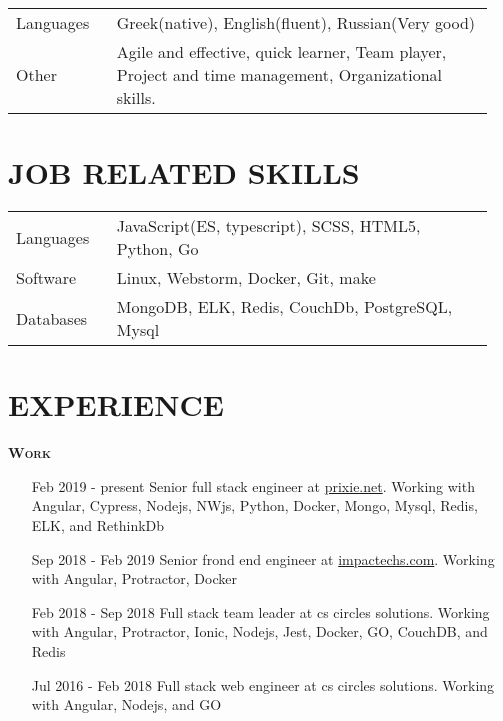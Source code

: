 \documentclass[margin, 11pt]{res} %
\begin{document}
\begin{resume}
        \begin{tabular}{p{0.2\linewidth} p{0.75\linewidth}}

            Languages & Greek(native), English(fluent), Russian(Very good) \\
            Other & Agile and effective, quick learner, Team player, Project and time management, Organizational skills.

        \end{tabular}

        \section{JOB RELATED SKILLS}\label{sec:job-related-skills}

        \begin{tabular}{p{0.2\linewidth} p{0.75\linewidth}}

            Languages & JavaScript(ES, typescript), SCSS, HTML5, Python, Go \\
            Software & Linux, Webstorm, Docker, Git, make \\
            Databases & MongoDB, ELK, Redis, CouchDb, PostgreSQL, Mysql

        \end{tabular}

        \section{EXPERIENCE}\label{sec:experience}

        \textsc{ \textbf{Work}}

        \begin{itemize}
            \item[Feb 2019 - present] Senior full stack engineer at \href{http://prixie.net}{prixie.net}.
            Working with Angular, Cypress, Nodejs, NWjs, Python, Docker, Mongo, Mysql, Redis, ELK, and RethinkDb

            \item[Sep 2018 - Feb 2019] Senior frond end engineer at \href{http://impactechs.com}{impactechs.com}.
            Working with Angular, Protractor, Docker

            \item[Feb 2018 - Sep 2018] Full stack team leader at cs circles solutions.
            Working with Angular, Protractor, Ionic, Nodejs, Jest, Docker, GO, CouchDB, and Redis

            \item[Jul 2016 - Feb 2018] Full stack web engineer at cs circles solutions.
            Working with Angular, Nodejs, and GO


\end{itemize}
\end{resume}
\end{document}
